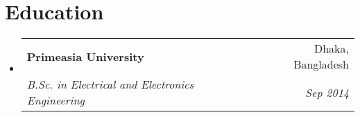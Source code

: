 \documentclass[letterpaper,10.5pt]{article}
\makeatletter
\newcommand{\resumeItem}[1]{
  \item\small{
    {#1 \vspace{-2pt}}
  }
}
\newcommand{\resumeSubheading}[4]{
  \vspace{-2pt}\item
    \begin{tabular*}{0.97\textwidth}[t]{l@{\extracolsep{\fill}}r}
      \textbf{#1} & #2 \\
      \textit{\small#3} & \textit{\small #4} \\
    \end{tabular*}\vspace{-7pt}
}
\newcommand{\resumeProjectHeading}[2]{
    \vspace{-2pt}\item
    \begin{tabular*}{0.97\textwidth}{l@{\extracolsep{\fill}}r}
      \small#1 & #2 \\
    \end{tabular*}\vspace{-7pt}
}
\newcommand{\resumeSubHeadingListStart}{\begin{itemize}[leftmargin=0.15in, label={}]}
\newcommand{\resumeSubHeadingListEnd}{\end{itemize}}
\newcommand{\resumeItemListStart}{\begin{itemize}}
\newcommand{\resumeItemListEnd}{\end{itemize}\vspace{-5pt}}
\makeatother
\begin{document}
      


\section{Education}
  \vspace{3pt}
  \resumeSubHeadingListStart
  
    \resumeSubheading
      {Primeasia University}{Dhaka, Bangladesh}
      {B.Sc. in Electrical and Electronics Engineering}{Sep 2014}
    
  \resumeSubHeadingListEnd


        



\end{document}
